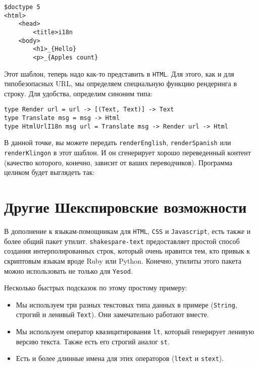 \begin{lstlisting}
$doctype 5
<html>
    <head>
        <title>i18n
    <body>
        <h1>_{Hello}
        <p>_{Apples count}
\end{lstlisting}

Этот шаблон, теперь надо как-то представить в \texttt{HTML}.  Для этого, как и
для типобезопасных URL, мы определяем специальную функцию рендеринга в строку.
Для удобства, определим синоним типа:

\begin{lstlisting}
type Render url = url -> [(Text, Text)] -> Text
type Translate msg = msg -> Html
type HtmlUrlI18n msg url = Translate msg -> Render url -> Html
\end{lstlisting}

В данной точке, вы можете передать \lstinline!renderEnglish!,
\lstinline!renderSpanish! или \lstinline!renderKlingon! в этот шаблон. И он
сгенерирует хорошо переведенный контент (качество которого, конечно, зависит от
ваших переводчиков). Программа целиком будет выглядеть так:

\section{Другие Шекспировские возможности}

В дополнение к языкам-помощникам для \texttt{HTML}, \texttt{CSS} и
\texttt{Javascript}, есть также и более общий пакет утилит.
\lstinline!shakespare-text! предоставляет простой способ создания
интерполированных строк, который очень нравится тем, кто привык к скриптовым
языкам вроде Ruby или Python. Конечно, утилиты этого пакета можно использовать
не только для \texttt{Yesod}.

Несколько быстрых подсказок по этому простому примеру:
\begin{itemize}
    \item Мы используем три разных текстовых типа данных в примере
        (\lstinline!String!, строгий и ленивый \lstinline!Text!). Они
        замечательно работают вместе.
    \item Мы используем оператор квазицитирования \lstinline!lt!, который
        генерирует ленивую версию текста. Также есть его строгий аналог
        \lstinline!st!.
    \item Есть и более длинные имена для этих операторов (\lstinline!ltext! и
        \lstinline!stext!).
\end{itemize}

